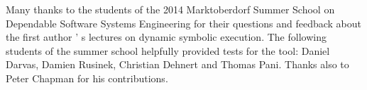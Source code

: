 ﻿\documentclass{IOS-Book-Article}
\begin{document}
\begin{mdP}[data-line={899}]%
{}Many thanks to the students of the 2014 Marktoberdorf Summer School
on Dependable Software Systems Engineering
for their questions and feedback about the first author%
{}{'}%
{}s lectures on dynamic
symbolic execution. The following students of the summer school
helpfully provided tests for the%
{}{\mdNbsp}%
{} tool: Daniel Darvas,
Damien Rusinek, Christian Dehnert and Thomas Pani. Thanks also to Peter
Chapman for his contributions.%
\end{mdP}%
\end{document}
